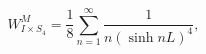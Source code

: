 \begin{equation}
W^{M}_{I\times S_4}=\frac{1}{8}
\sum^\infty_{n=1}\frac{1}{n(\sinh nL)^4},
\label{afl}
\end{equation}


